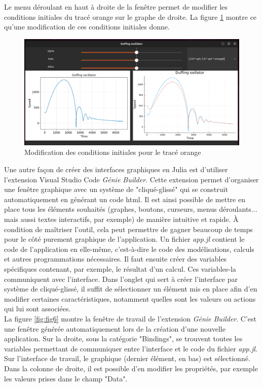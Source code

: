 \documentclass[a4paper, french, 12pt, titlepage]{article}
\begin{document}
Le menu déroulant en haut à droite de la fenêtre permet de modifier les conditions initiales du tracé orange sur le graphe de droite. La figure \ref{fig:fig5} montre ce qu'une modification de ces conditions initiales donne. \\

\begin{figure}[H]
  \includegraphics[width=\linewidth]{interactivewindow_4.png}
  \caption{Modification des conditions initiales pour le tracé orange}
  \label{fig:fig5}
\end{figure}

Une autre façon de créer des interfaces graphiques en Julia est d'utiliser l'extension Visual Studio Code \emph{Génie Builder}. Cette extension permet d'organiser une fenêtre graphique avec un système de "cliqué-glissé" qui se construit automatiquement en générant un code html. Il est ainsi possible de mettre en place tous les éléments souhaités (graphes, boutons, curseurs, menus déroulants... mais aussi textes interactifs, par exemple) de manière intuitive et rapide. À condition de maîtriser l'outil, cela peut permettre de gagner beaucoup de temps pour le côté purement graphique de l'application. Un fichier \emph{app.jl} contient le code de l'application en elle-même, c'est-à-dire le code des modélisations, calculs et autres programmations nécessaires. Il faut ensuite créer des variables spécifiques contenant, par exemple, le résultat d'un calcul. Ces variables-la communiquent avec l'interface. Dans l'onglet qui sert à créer l'interface par système de cliqué-glissé, il suffit de sélectionner un élément mis en place afin d'en modifier certaines caractéristiques, notamment quelles sont les valeurs ou actions qui lui sont associées. \\

La figure \ref{fig:fig6} montre la fenêtre de travail de l'extension \emph{Génie Builder}. C'est une fenêtre générée automatiquement lors de la création d'une nouvelle application. Sur la droite, sous la catégorie "Bindings", se trouvent toutes les variables permettant de communiquer entre l'interface et le code du fichier \emph{app.jl}. Sur l'interface de travail, le graphique (dernier élément, en bas) est sélectionné. Dans la colonne de droite, il est possible d'en modifier les propriétés, par exemple les valeurs prises dans le champ "Data". \\
\end{document}
